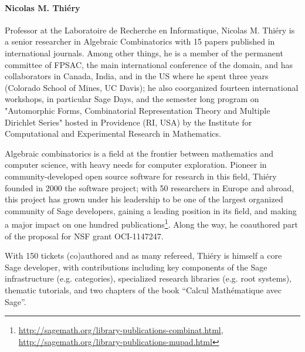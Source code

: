 \paragraph{Nicolas M. Thiéry}


Professor at the Laboratoire de Recherche en Informatique, Nicolas
M. Thiéry is a senior researcher in Algebraic Combinatorics with 15
papers published in international journals. Among other things, he is
a member of the permanent committee of FPSAC, the main international
conference of the domain, and has collaborators in Canada, India, and
in the US where he spent three years (Colorado School of Mines, UC
Davis); he also coorganized fourteen international workshops, in
particular Sage Days, and the semester long program on "Automorphic
Forms, Combinatorial Representation Theory and Multiple Dirichlet
Series" hosted in Providence (RI, USA) by the Institute for
Computational and Experimental Research in Mathematics.

Algebraic combinatorics is a field at the frontier between mathematics
and computer science, with heavy needs for computer
exploration. Pioneer in community-developed open source software for
research in this field, Thiéry founded in 2000 the \SageCombinat
software project; with 50 researchers in Europe and abroad, this
project has grown under his leadership to be one of the largest
organized community of Sage developers, gaining a leading position in
its field, and making a major impact on one hundred
publications\footnote{\url{http://sagemath.org/library-publications-combinat.html},
\url{http://sagemath.org/library-publications-mupad.html}}. Along the
way,
he coauthored part of the proposal for NSF \SageCombinat grant
OCI-1147247.

With 150 tickets (co)authored and as many refereed, Thiéry is himself
a core Sage developer, with contributions including key components of
the Sage infrastructure (e.g. categories), specialized research
libraries (e.g. root systems), thematic tutorials, and two chapters of
the book ``Calcul Mathématique avec Sage''.
